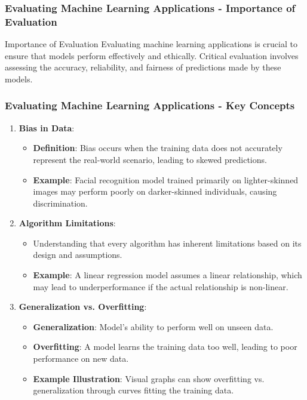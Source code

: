 \documentclass[aspectratio=169]{beamer}
\begin{document}
\begin{frame}[fragile]
    \frametitle{Evaluating Machine Learning Applications - Importance of Evaluation}
    \begin{block}{Importance of Evaluation}
        Evaluating machine learning applications is crucial to ensure that models perform effectively and ethically. 
        Critical evaluation involves assessing the accuracy, reliability, and fairness of predictions made by these models.
    \end{block}
\end{frame}

\begin{frame}[fragile]
    \frametitle{Evaluating Machine Learning Applications - Key Concepts}
    \begin{enumerate}
        \item \textbf{Bias in Data}:
            \begin{itemize}
                \item \textbf{Definition}: Bias occurs when the training data does not accurately represent the real-world scenario, leading to skewed predictions.
                \item \textbf{Example}: Facial recognition model trained primarily on lighter-skinned images may perform poorly on darker-skinned individuals, causing discrimination.
            \end{itemize}
        \item \textbf{Algorithm Limitations}:
            \begin{itemize}
                \item Understanding that every algorithm has inherent limitations based on its design and assumptions.
                \item \textbf{Example}: A linear regression model assumes a linear relationship, which may lead to underperformance if the actual relationship is non-linear.
            \end{itemize}
        \item \textbf{Generalization vs. Overfitting}:
            \begin{itemize}
                \item \textbf{Generalization}: Model's ability to perform well on unseen data.
                \item \textbf{Overfitting}: A model learns the training data too well, leading to poor performance on new data.
                \item \textbf{Example Illustration}: Visual graphs can show overfitting vs. generalization through curves fitting the training data.
            \end{itemize}
    \end{enumerate}
\end{frame}
\end{document}
